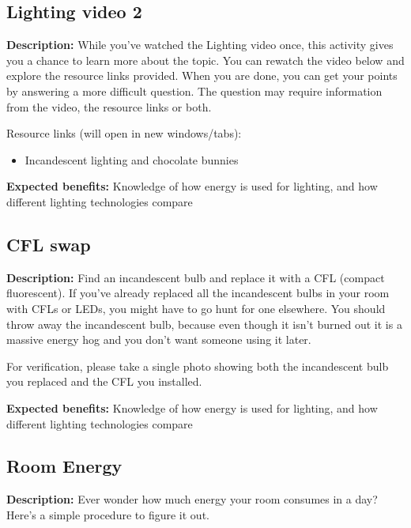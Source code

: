 \subsection{Lighting video 2}

\textbf{Description:} While you've watched the Lighting video once, this activity gives you a chance to learn more about the topic. You can rewatch the video below and explore the resource links provided. When you are done, you can get your points by answering a more difficult question. The question may require information from the video, the resource links or both.

Resource links (will open in new windows/tabs):

\begin{itemize}
	\item Incandescent lighting and chocolate bunnies
\end{itemize}

\vspace{2ex}
\textbf{Expected benefits:} Knowledge of how energy is used for lighting, and how different lighting technologies compare


\subsection{CFL swap}

\textbf{Description:} Find an incandescent bulb and replace it with a CFL (compact fluorescent). If you've already replaced all the incandescent bulbs in your room with CFLs or LEDs, you might have to go hunt for one elsewhere. You should throw away the incandescent bulb, because even though it isn't burned out it is a massive energy hog and you don't want someone using it later.

For verification, please take a single photo showing both the incandescent bulb you replaced and the CFL you installed.

\vspace{2ex}
\textbf{Expected benefits:} Knowledge of how energy is used for lighting, and how different lighting technologies compare


\subsection{Room Energy}

\textbf{Description:} Ever wonder how much energy your room consumes in a day? Here's a simple procedure to figure it out.

